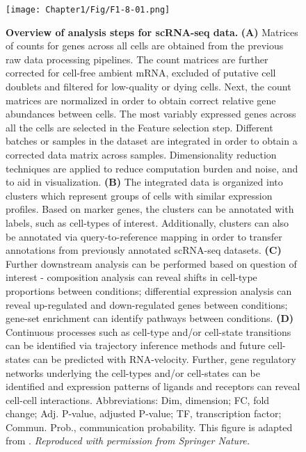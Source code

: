 \begin{figure}[H]
    \centering
    \texttt{[image: Chapter1/Fig/F1-8-01.png]}
    \caption[Workflow for pre-processing and analysis of single-cell RNA sequencing data]
    {\textbf{Overview of analysis steps for scRNA-seq data.} \textbf{(A)} Matrices of counts for genes across all cells are obtained from the previous raw data processing pipelines. The count matrices are further corrected for cell-free ambient mRNA, excluded of putative cell doublets and filtered for low-quality or dying cells. Next, the count matrices are normalized in order to obtain correct relative gene abundances between cells. The most variably expressed genes across all the cells are selected in the Feature selection step. Different batches or samples in the dataset are integrated in order to obtain a corrected data matrix across samples. Dimensionality reduction techniques are applied to reduce computation burden and noise, and to aid in visualization. \textbf{(B)} The integrated data is organized into clusters which represent groups of cells with similar expression profiles. Based on marker genes, the clusters can be annotated with labels, such as cell-types of interest. Additionally, clusters can also be annotated via query-to-reference mapping in order to transfer annotations from previously annotated scRNA-seq datasets. \textbf{(C)} Further downstream analysis can be performed based on question of interest - composition analysis can reveal shifts in cell-type proportions between conditions; differential expression analysis can reveal up-regulated and down-regulated genes between conditions; gene-set enrichment can identify pathways between conditions. \textbf{(D)} Continuous processes such as cell-type and/or cell-state transitions can be identified via trajectory inference methods and future cell-states can be predicted with RNA-velocity. Further, gene regulatory networks underlying the cell-types and/or cell-states can be identified and expression patterns of ligands and receptors can reveal cell-cell interactions. Abbreviations: Dim, dimension; FC, fold change; Adj. P-value, adjusted P-value; TF, transcription factor; Commun. Prob., communication probability. This figure is adapted from \textbf{\cite{heumos_best_2023,weiler_guide_2022,armingol_deciphering_2021}}.\textit{ Reproduced with permission from Springer Nature.}}
    \label{fig:chp1_scrna-workflow}
\end{figure}
    

